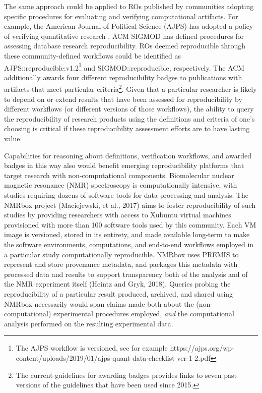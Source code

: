 The same approach could be applied to ROs published by communities adopting specific
    procedures for evaluating and verifying computational artifacts.
For example, the American Journal of Political Science (AJPS) has adopted a policy of
    verifying quantitative research \cite{christian2018}.
ACM SIGMOD has defined procedures for assessing database research reproducibility.
ROs deemed reproducible through these community-defined workflows could be
    identified as \textsf{AJPS::reproducible:v1.2}\footnote{
        The AJPS workflow is versioned, see for example
        https://ajps.org/wp-content/uploads/2019/01/ajps-quant-data-checklist-ver-1-2.pdf
    } and \textsf{SIGMOD::reproducible}, respectively.
The ACM additionally awards four different reproducibility badges to publications
    with artifacts that meet particular criteria\footnote{The current guidelines for awarding
    badges provides links to seven past versions of the guidelines that have been used since 2015.}.
Given that a particular researcher is likely to depend on or extend results that have been
    assessed for reproducibility by different workflows (or different versions of those
    workflows), the ability to query the reproducibility of research products using the definitions and
    criteria of one's choosing is critical if these reproducibility assessment efforts
    are to have lasting value.

Capabilities for reasoning about definitions, verification workflows, and awarded
    badges in this way also would benefit emerging reproducibility platforms that
    target research with non-computational components.
Biomolecular nuclear magnetic resonance (NMR) spectroscopy is
    computationally intensive, with studies requiring dozens of software tools for data
    processing and analysis.
The NMRbox project (Maciejewski, et al., 2017) aims to foster reproducibility of such studies
    by providing researchers with access to
    Xubuntu virtual machines provisioned with more than 100 software tools used by this community.
Each VM image is versioned, stored in its entirety, and made
    available long-term to make the software environments, computations, and end-to-end workflows
    employed in a particular study computationally reproducible.
NMRbox uses PREMIS to represent and store provenance metadata, and packages this metadata with
    processed data and results to support transparency both of the analysis and of the NMR
    experiment itself (Heintz and Gryk, 2018).
Queries probing the reproducibility of a particular result produced, archived, and shared
    using NMRbox necessarily would span claims made both about the (non-computational)
    experimental procedures employed, \emph{and} the computational analysis performed on
    the resulting experimental data.

